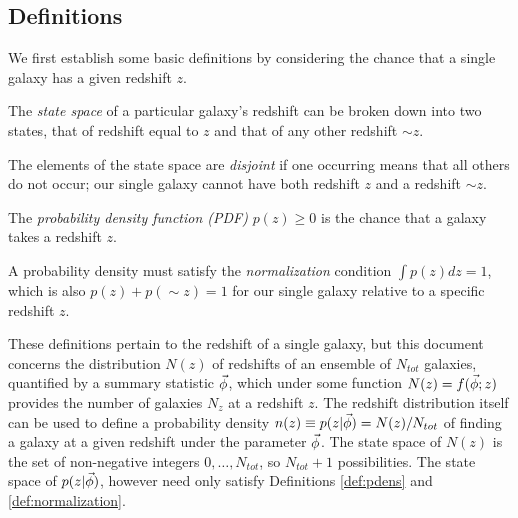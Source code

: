 \subsection{Definitions}
\label{sec:def}

We first establish some basic definitions by considering the chance that a single galaxy has a given redshift $z$.
\begin{definition}\label{def:binarystatespace}
	The \textit{state space} of a particular galaxy's redshift can be broken down into two states, that of redshift equal to $z$ and that of any other redshift $\sim z$.
\end{definition}
\begin{definition}
	The elements of the state space are \textit{disjoint} if one occurring means that all others do not occur; our single galaxy cannot have both redshift $z$ and a redshift $\sim z$.
\end{definition}
\begin{definition}\label{def:pdens}
	The \textit{probability density function (PDF)} $p(z) \geq 0$ is the chance that a galaxy takes a redshift $z$.
\end{definition}
\begin{definition}\label{def:normalization}
	A probability density must satisfy the \textit{normalization} condition $\int p(z) dz = 1$, which is also $p(z) + p(\sim z) = 1$ for our single galaxy relative to a specific redshift $z$.
\end{definition}

These definitions pertain to the redshift of a single galaxy, but this document concerns the distribution $N(z)$ of redshifts of an ensemble of $N_{tot}$ galaxies, quantified by a summary statistic $\vec{\phi}$, which under some function $N(z) = f(\vec{\phi}; z)$ provides the number of galaxies $N_{z}$ at a redshift $z$.
The redshift distribution itself can be used to define a probability density $n(z) \equiv p(z \vert \vec{\phi}) = N(z) / N_{tot}$ of finding a galaxy at a given redshift under the parameter $\vec{\phi}$.
The state space of $N(z)$ is the set of non-negative integers $0, \dots, N_{tot}$, so $N_{tot}+1$ possibilities.
The state space of $p(z \vert \vec{\phi})$, however need only satisfy Definitions \ref{def:pdens} and \ref{def:normalization}.



